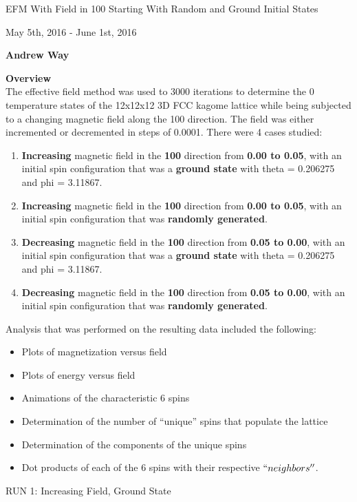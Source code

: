 \documentclass{article}
\begin{document}
\thispagestyle{plain}
\begin{center}
    \Large
    EFM With Field in 100 Starting With Random and Ground Initial States
    
    \vspace{0.4cm}
    \large
    May 5th, 2016 - June 1st, 2016
    
    \vspace{0.4cm}
    \textbf{Andrew Way}
    
    \vspace{0.9cm}
    \textbf{Overview} \\
    \vspace{5mm}
    The effective field method was used to 3000 iterations to determine the 0 temperature states of 
    the 12x12x12 3D FCC kagome lattice while being subjected to a changing magnetic field along the 100 
    direction. The field was either incremented or decremented in steps of 0.0001. 
    There were 4 cases studied:
    \begin{enumerate}
     \item \textbf{Increasing} magnetic field in the \textbf{100} direction from \textbf{0.00 to 0.05},
     with an initial 
     spin configuration that was a \textbf{ground state} with theta = 0.206275 and phi = 3.11867.
     \item \textbf{Increasing} magnetic field in the \textbf{100} direction from \textbf{0.00 to 0.05},
     with an initial 
     spin configuration that was \textbf{randomly generated}.
     \item \textbf{Decreasing} magnetic field in the \textbf{100} direction from \textbf{0.05 to 0.00},
     with an initial
     spin configuration that was a \textbf{ground state} with theta = 0.206275 and phi = 3.11867.
     \item \textbf{Decreasing} magnetic field in the \textbf{100} direction from \textbf{0.05 to 0.00},
     with an initial
     spin configuration that was \textbf{randomly generated}.
    \end{enumerate}
    Analysis that was performed on the resulting data included the following:
    \begin{itemize}
     \item Plots of magnetization versus field
     \item Plots of energy versus field
     \item Animations of the characteristic 6 spins 
     \item Determination of the number of ``unique'' spins that populate the lattice
     \item Determination of the components of the unique spins
     \item Dot products of each of the 6 spins with their respective $``neighbors''$.  
    \end{itemize}

\end{center}
\pagebreak
\thispagestyle{plain}
\begin{center}
\LARGE
RUN 1: Increasing Field, Ground State
\end{center}
\end{document}
